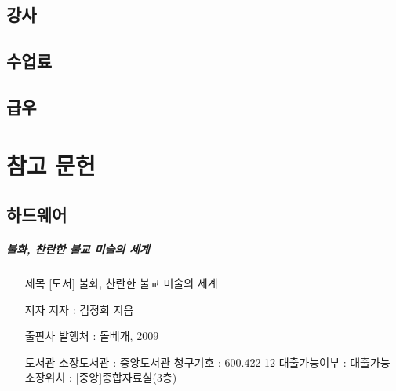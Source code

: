 \documentclass[12pt, a4paper, oneside]{book}
\let\stdsection\section
\renewcommand\section{\newpage\stdsection}
\begin{document}
%
	\section{ 강사}



	\section{ 수업료}



	\section{ 급우}


	\chapter{참고 문헌 }
	\noptcrule

	\newpage	
	\minitoc


	\section{ 하드웨어}

\paragraph{ 불화, 찬란한 불교 미술의 세계 }

\begin{itemize}[					
		topsep=0.0em,			
		parsep=0.0em,			
		itemsep=0em,			
		leftmargin=	5	em,
		labelwidth=	1	em,			
		labelsep=		1	 em			
]					

	\item	[제목]	[도서] 불화, 찬란한 불교 미술의 세계	\item	[저자]	저자 : 김정희 지음	\item	[출판사]	발행처 : 돌베개, 2009	\item	[도서관]	소장도서관 : 중앙도서관	청구기호 : 600.422-12	대출가능여부 : 대출가능	소장위치 : [중앙]종합자료실(3층)

\end{itemize}					
\end{document}
